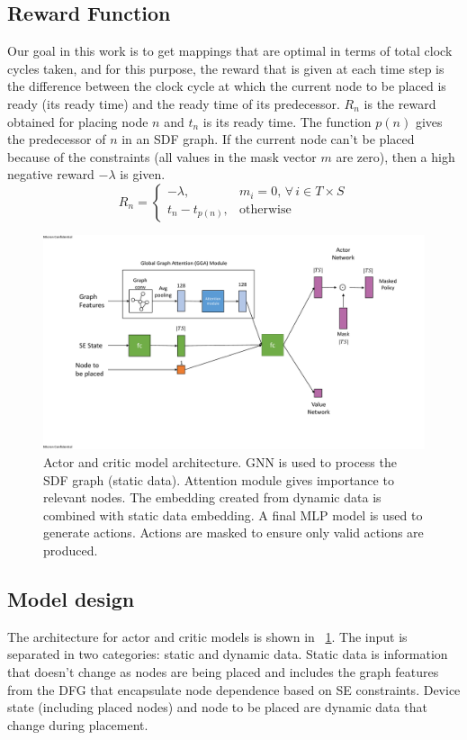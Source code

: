\subsection{Reward Function}
Our goal in this work is to get mappings that are optimal in terms of total clock cycles taken, and for this purpose, the reward that is given at each time step is the difference between the clock cycle at which the current node to be placed is ready (its ready time) and the ready time of its predecessor. 
$R_n$ is the reward obtained for placing node $n$ and $t_n$ is its ready time. 
The function $p(n)$ gives the predecessor of $n$ in an SDF graph. 
If the current node can't be placed because of the constraints (all values in the mask vector $m$ are zero), then a high negative reward $-\lambda$ is given.
\[
  R_n =
  \begin{cases}
    -\lambda,& m_i = 0, \, \forall \, i \in T \times S \\
    t_n - t_{p(n)}, & \text{otherwise}
    
  \end{cases}
\]

\begin{figure}[tb]
  \centering
  \includegraphics[width=\textwidth]{fig/model_diagram.pdf}
  \caption{Actor and critic model architecture. 
  GNN is used to process the SDF graph (static data). 
  Attention module gives importance to relevant nodes. 
  The embedding created from dynamic data is combined with static data embedding. 
  A final MLP model is used to generate actions. 
  Actions are masked to ensure only valid actions are produced. }
  \label{fig:model}
\end{figure}

\subsection{Model design}
The architecture for actor and critic models is shown in \figurename~\ref{fig:model}.
The input is separated in two categories: static and dynamic data. 
Static data is information that doesn't change as nodes are being placed and includes the graph features from the DFG that encapsulate node dependence based on SE constraints.
Device state (including placed nodes) and node to be placed are dynamic data that change during placement.

